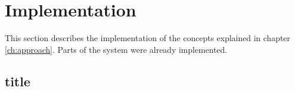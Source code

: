 \chapter{Implementation}
\label{ch:implementation}



This section describes the implementation of the concepts explained in chapter \ref{ch:approach}.
Parts of the system were already implemented.


\section{title}


	